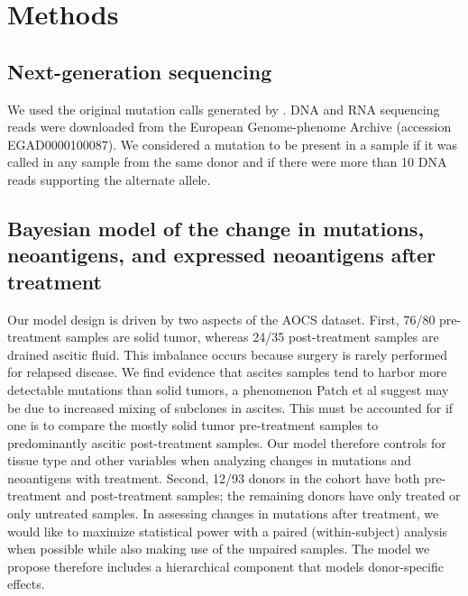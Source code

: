 \section*{Methods}
\subsection*{Next-generation sequencing}
We used the original mutation calls generated by \cite{Patch_2015}. DNA and RNA sequencing reads were downloaded from the European Genome-phenome Archive (accession EGAD0000100087). We considered a mutation to be present in a sample if it was called in any sample from the same donor and if there were more than 10 DNA reads supporting the alternate allele.

\subsection*{Bayesian model of the change in mutations, neoantigens, and expressed neoantigens after treatment}
Our model design is driven by two aspects of the AOCS dataset. First, 76/80 pre-treatment samples are solid tumor, whereas 24/35 post-treatment samples are drained ascitic fluid. This imbalance occurs because surgery is rarely performed for relapsed disease. We find evidence that ascites samples tend to harbor more detectable mutations than solid tumors, a phenomenon Patch et al suggest may be due to increased mixing of subclones in ascites. This must be accounted for if one is to compare the mostly solid tumor pre-treatment samples to predominantly ascitic post-treatment samples. Our model therefore controls for tissue type and other variables when analyzing changes in mutations and neoantigens with treatment. Second, 12/93 donors in the cohort have both pre-treatment and post-treatment samples; the remaining donors have only treated or only untreated samples. In assessing changes in mutations after treatment, we would like to maximize statistical power with a paired (within-subject) analysis when possible while also making use of the unpaired samples. The model we propose therefore includes a hierarchical component that models donor-specific effects.


